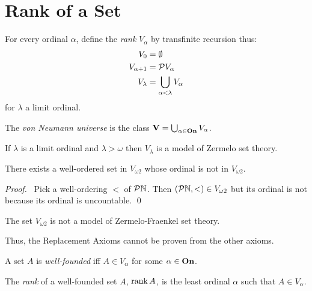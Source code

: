 \section{Rank of a Set}

\begin{definition}
    For every ordinal $\alpha$, define the \emph{rank} $V_\alpha$
    by transfinite recursion thus:
    \begin{align*}
        V_0 & = \emptyset \\
        V_{\alpha + 1} & = \mathcal{P} V_\alpha \\
        V_\lambda & = \bigcup_{\alpha < \lambda} V_\alpha
    \end{align*}
    for $\lambda$ a limit ordinal.

    The \emph{von Neumann universe} is the class $\mathbf{V} = \bigcup_{\alpha \in \mathbf{On}} V_\alpha$.
\end{definition}

\begin{theorem}
    If $\lambda$ is a limit ordinal and $\lambda > \omega$
    then $V_\lambda$ is a model of Zermelo set theory.
\end{theorem}

\begin{lemma}[AC]
    There exists a well-ordered set in $V_{\omega 2}$ whose
    ordinal is not in $V_{\omega 2}$.
\end{lemma}

\begin{proof}
    \pf\ Pick a well-ordering $<$ of $\mathcal{P} \mathbb{N}$. Then $(\mathcal{P} \mathbb{N}, <) \in
    V_{\omega 2}$ but its ordinal is not because its ordinal is uncountable. \qed
\end{proof}

\begin{theorem}
    The set $V_{\omega 2}$ is not a model of Zermelo-Fraenkel set theory.
\end{theorem}

Thus, the Replacement Axioms cannot be proven from the other axioms.

\begin{definition}
    A set $A$ is \emph{well-founded} iff $A \in V_\alpha$ for some $\alpha \in \mathbf{On}$.
\end{definition}

\begin{definition}[Rank]
    The \emph{rank} of a well-founded set $A$, $\operatorname{rank} A$, is the least
    ordinal $\alpha$ such that $A \in V_\alpha$.    
\end{definition}

